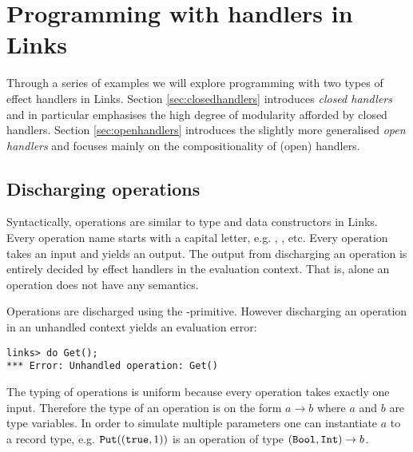 \chapter{Programming with handlers in Links}\label{ch:programming-with-handlers}
Through a series of examples we will explore programming with two types of effect handlers in Links. Section \ref{sec:closedhandlers} introduces \emph{closed handlers} and in particular emphasises the high degree of modularity afforded by closed handlers. Section \ref{sec:openhandlers} introduces the slightly more generalised \emph{open handlers} and focuses mainly on the compositionality of (open) handlers.

\section{Discharging operations}\label{sec:discharge}
Syntactically, operations are similar to type and data constructors in Links. Every operation name starts with a capital letter, e.g. , , etc. Every operation takes an input and yields an output. The output from discharging an operation is entirely decided by effect handlers in the evaluation context. That is, alone an operation does not have any semantics.

Operations are discharged using the -primitive. However discharging an operation in an unhandled context yields an evaluation error:
\begin{lstlisting}[style=links]
links> do Get();
*** Error: Unhandled operation: Get()
\end{lstlisting}
The typing of operations is uniform because every operation takes exactly one input. Therefore the type of an operation is on the form $a \to b$ where $a$ and $b$ are type variables. In order to simulate multiple parameters one can instantiate $a$ to a record type, e.g. $\texttt{Put}((\texttt{true},1))$ is an operation of type $(\texttt{Bool},\texttt{Int}) \to b$.
